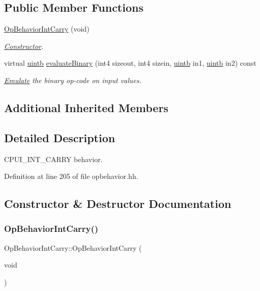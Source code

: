 \subsection*{Public Member Functions}
\begin{DoxyCompactItemize}
\item 
\mbox{\hyperlink{class_op_behavior_int_carry_a800ebfc75e378a845c79374068013f11}{Op\+Behavior\+Int\+Carry}} (void)
\begin{DoxyCompactList}\small\item\em \mbox{\hyperlink{class_constructor}{Constructor}}. \end{DoxyCompactList}\item 
virtual \mbox{\hyperlink{types_8h_a2db313c5d32a12b01d26ac9b3bca178f}{uintb}} \mbox{\hyperlink{class_op_behavior_int_carry_a027acae9fdc342d2e15244189e252367}{evaluate\+Binary}} (int4 sizeout, int4 sizein, \mbox{\hyperlink{types_8h_a2db313c5d32a12b01d26ac9b3bca178f}{uintb}} in1, \mbox{\hyperlink{types_8h_a2db313c5d32a12b01d26ac9b3bca178f}{uintb}} in2) const
\begin{DoxyCompactList}\small\item\em \mbox{\hyperlink{class_emulate}{Emulate}} the binary op-\/code on input values. \end{DoxyCompactList}\end{DoxyCompactItemize}
\subsection*{Additional Inherited Members}


\subsection{Detailed Description}
C\+P\+U\+I\+\_\+\+I\+N\+T\+\_\+\+C\+A\+R\+RY behavior. 

Definition at line 205 of file opbehavior.\+hh.



\subsection{Constructor \& Destructor Documentation}
\mbox{\label{class_op_behavior_int_carry_a800ebfc75e378a845c79374068013f11}} 
\subsubsection{\texorpdfstring{OpBehaviorIntCarry()}{OpBehaviorIntCarry()}}
{\footnotesize\ttfamily Op\+Behavior\+Int\+Carry\+::\+Op\+Behavior\+Int\+Carry (\begin{DoxyParamCaption}\item[{void}]{ }\end{DoxyParamCaption})\hspace{0.3cm}{\ttfamily [inline]}}



